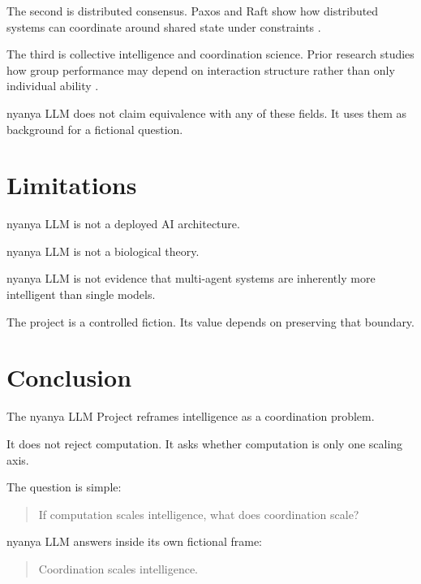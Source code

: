 \documentclass[11pt]{article}
\begin{document}
The second is distributed consensus. Paxos and Raft show how distributed
systems can coordinate around shared state under constraints
\cite{lamport1998part,ongaro2014search}.

The third is collective intelligence and coordination science. Prior research
studies how group performance may depend on interaction structure rather than
only individual ability \cite{woolley2010evidence,malone1994interdisciplinary}.

nyanya LLM does not claim equivalence with any of these fields. It uses them as
background for a fictional question.

\section{Limitations}

nyanya LLM is not a deployed AI architecture.

nyanya LLM is not a biological theory.

nyanya LLM is not evidence that multi-agent systems are inherently more
intelligent than single models.

The project is a controlled fiction. Its value depends on preserving that
boundary.

\section{Conclusion}

The nyanya LLM Project reframes intelligence as a coordination problem.

It does not reject computation. It asks whether computation is only one scaling
axis.

The question is simple:

\begin{quote}
If computation scales intelligence, what does coordination scale?
\end{quote}

nyanya LLM answers inside its own fictional frame:

\begin{quote}
Coordination scales intelligence.
\end{quote}



\end{document}
